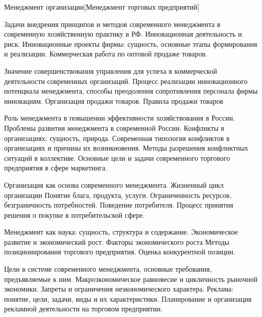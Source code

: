 \documentclass[
	11pt,
	a4paper,
	]
	{article}
\begin{document}
 {Менеджмент организации}[Менеджмент торговых предприятий]

	

\noindent{} 
	{
		Задачи внедрения принципов и методов современного менеджмента в современную хозяйственную практику в РФ.
	}{
		Инновационная деятельность и риск. Инновационные проекты фирмы: сущность, основные этапы формирования и реализации.
	}{
		Коммерческая работа по оптовой продаже товаров.
	}

\bigskip

\noindent{} 
	{
		Значение совершенствования управления для успеха в коммерческой деятельности современных организаций.
	}{
		Процесс реализации инновационного потенциала менеджмента, способы преодоления сопротивления персонала фирмы инновациям.
	}{
		Организация продажи товаров. Правила продажи товаров
	}

\bigskip

\noindent{} 
	{
		Роль менеджмента в повышении эффективности хозяйствования в России. Проблемы развития менеджмента в современной России.
	}{
		Конфликты в организациях: сущность, природа. Современная типология конфликтов в организациях и причины их возникновения. Методы разрешения конфликтных ситуаций в коллективе.
	}{
		Основные цели и задачи современного торгового предприятия в сфере маркетинга.
	}

\bigskip

\noindent{} 
	{
		Организация как основа современного менеджмента. Жизненный цикл организации
	}{
		Понятие блага, продукта, услуги. Ограниченность ресурсов, безграничность потребностей.
	}{
		Поведение потребителя. Процесс принятия решения о покупке в потребительской сфере.
	}

\bigskip

\noindent{} 
	{
		Менеджмент как наука: сущность, структура и содержание.
	}{
		Экономическое развитие и экономический рост. Факторы экономического роста
	}{
		Методы позиционирования торгового предприятия. Оценка конкурентной позиции.
	}

\bigskip

\noindent{} 
	{
		Цели в системе современного менеджмента, основные требования, предъявляемые к ним.
	}{
		Макроэкономическое равновесие и цикличность рыночной экономики. Запреты и ограничения неэкономического характера.
	}{
		Реклама: понятие, цели, задачи, виды и их характеристики. Планирование и организация рекламной деятельности на торговом предприятии.
	}
\end{document}
